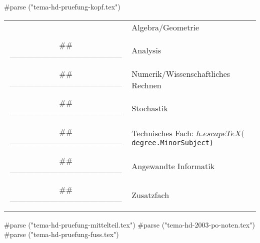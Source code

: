


#parse ("tema-hd-pruefung-kopf.tex")
\vspace*{0.2cm}

\renewcommand{\arraystretch}{1.2}
\begin{center}
\begin{tabular}{|c|p{14.6cm}|}
\hline
\hspace*{.3cm}
& {\large Algebra/Geometrie} \\\\
\hline ## ------------------------------------------
& {\large Analysis} \\\\
\hline ## ------------------------------------------
& {\large Numerik/Wissenschaftliches Rechnen}\\\\
\hline ## ------------------------------------------
& {\large Stochastik}\\\\
\hline ## ------------------------------------------
& {\large Technisches Fach: {\tt $h.escapeTeX($degree.MinorSubject)}}\\\\
\hline ## ------------------------------------------
& {\large Angewandte Informatik}\\\\
\hline ## ------------------------------------------
& {\large Zusatzfach} \\\\
\hline
\end{tabular}
\end{center}
\renewcommand{\arraystretch}{1}

#parse ("tema-hd-pruefung-mittelteil.tex")
\vspace*{0.3cm}
#parse ("tema-hd-2003-po-noten.tex")
#parse ("tema-hd-pruefung-fuss.tex")

